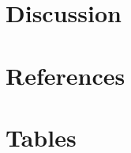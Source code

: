 \documentclass[12pt]{article}
\begin{document}








\section*{Discussion}


\section*{References}

     


\section*{Tables}
\end{document}
